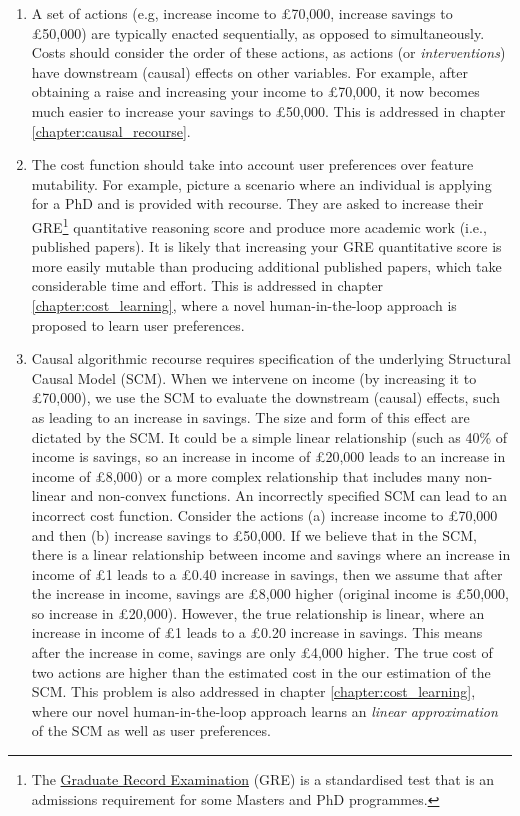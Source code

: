 \begin{enumerate}
	\item A set of actions (e.g, increase income to £70,000, increase savings to £50,000) are typically enacted sequentially, as opposed to simultaneously. Costs should consider the order of these actions, as actions (or \textit{interventions}) have downstream (causal) effects on other variables. For example, after obtaining a raise and increasing your income to £70,000, it now becomes much easier to increase your savings to £50,000. This is addressed in chapter \ref{chapter:causal_recourse}.
	
	\item The cost function should take into account user preferences over feature mutability. For example, picture a scenario where an individual is applying for a PhD and is provided with recourse. They are asked to increase their GRE\footnote{The \href{https://www.ets.org/gre.html}{Graduate Record Examination} (GRE) is a standardised test that is an admissions requirement for some Masters and PhD programmes.} quantitative reasoning score and produce more academic work (i.e., published papers). It is likely that increasing your GRE quantitative score is more easily mutable than producing additional published papers, which take considerable time and effort. This is addressed in chapter \ref{chapter:cost_learning}, where a novel human-in-the-loop approach is proposed to learn user preferences.
	
	\item Causal algorithmic recourse requires specification of the underlying Structural Causal Model (SCM). When we intervene on income (by increasing it to £70,000), we use the SCM to evaluate the downstream (causal) effects, such as leading to an increase in savings. The size and form of this effect are dictated by the SCM. It could be a simple linear relationship (such as 40\% of income is savings, so an increase in income of £20,000 leads to an increase in income of £8,000) or a more complex relationship that includes many non-linear and non-convex functions. An incorrectly specified SCM can lead to an incorrect cost function. Consider the actions (a) increase income to £70,000 and then (b) increase savings to £50,000. If we believe that in the SCM, there is a linear relationship between income and savings where an increase in income of £1 leads to a £0.40 increase in savings, then we assume that after the increase in income, savings are £8,000 higher (original income is £50,000, so increase in £20,000). However, the true relationship is linear, where an increase in income of £1 leads to a £0.20 increase in savings. This means after the increase in come, savings are only £4,000 higher. The true cost of two actions are higher than the estimated cost in the our estimation of the SCM. This problem is also addressed in chapter \ref{chapter:cost_learning}, where our novel human-in-the-loop approach learns an \textit{linear approximation} of the SCM as well as user preferences.
	
	
\end{enumerate}


